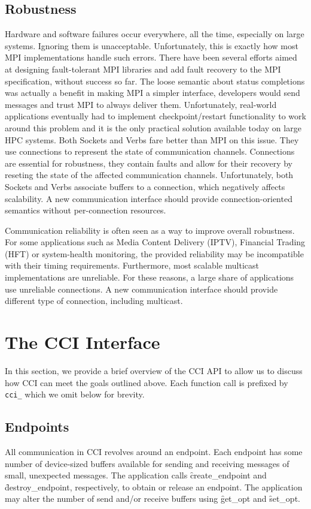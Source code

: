 \documentclass[conference]{IEEEtran}
\begin{document}
\subsection{Robustness}
Hardware and software failures occur everywhere, all the time, especially on 
large systems. Ignoring them is unacceptable. Unfortunately, this is exactly 
how most MPI implementations handle such errors. There have been several 
efforts aimed at designing fault-tolerant MPI libraries and add fault recovery 
to the MPI specification, without success so far. The loose semantic about 
status completions was actually a benefit in making MPI a simpler interface, 
developers would send messages and trust MPI to always deliver them. 
Unfortunately, real-world applications eventually had to implement 
checkpoint/restart functionality to work around this problem and it is the 
only practical solution available today on large HPC systems. 
Both Sockets and Verbs fare better than MPI on this issue. They use connections 
to represent the state of communication channels. Connections are essential 
for robustness, they contain faults and allow for their recovery by reseting 
the state of the affected communication channels. 
Unfortunately, both Sockets and Verbs associate buffers to a connection, which 
negatively affects scalability. A new communication interface should provide 
connection-oriented semantics without per-connection resources. 

Communication reliability is often seen as a way to improve overall robustness. 
For some applications such as Media Content Delivery (IPTV), Financial Trading 
(HFT) or system-health monitoring, the provided reliability may be incompatible 
with their timing requirements. 
Furthermore, most scalable multicast implementations are unreliable. For these 
reasons, a large share of applications use unreliable connections. 
A new communication interface should provide different type of connection, 
including multicast. 


\section{The CCI Interface}
In this section, we provide a brief overview of the CCI API to allow us to discuss how CCI
can meet the goals outlined above. Each function call is prefixed by \texttt{cci\_} which
we omit below for brevity.

\subsection{Endpoints}
All communication in CCI revolves around an endpoint. Each endpoint has some number of
device-sized buffers available for sending and receiving messages of small, unexpected
messages. The application calls \f{create\_endpoint} and \f{destroy\_endpoint},
respectively, to obtain or release an endpoint. The application may alter the number of
send and/or receive buffers using \f{get\_opt} and \f{set\_opt}.
\end{document}
